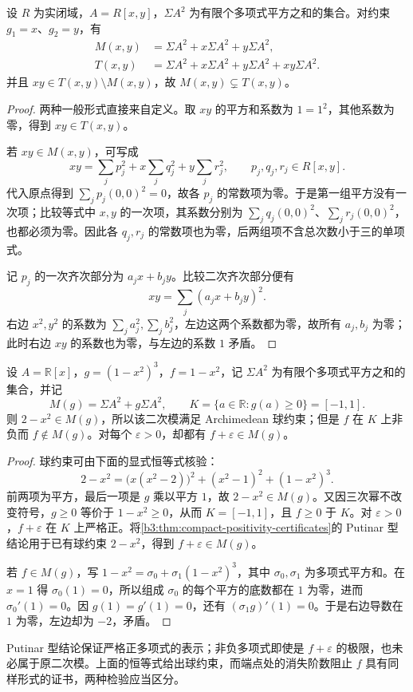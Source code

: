 \begin{proposition}\label{b3:prop:G-module-preordering-difference}
	设 \(R\) 为实闭域，\(A=R[x,y]\)，\(\Sigma A^2\) 为有限个多项式平方之和的集合。对约束 \(g_1=x\)、\(g_2=y\)，有
	\[
		\begin{aligned}
			M(x,y)&=\Sigma A^2+x\Sigma A^2+y\Sigma A^2,\\
			T(x,y)&=\Sigma A^2+x\Sigma A^2+y\Sigma A^2+xy\Sigma A^2.
		\end{aligned}
	\]
	并且 \(xy\in T(x,y)\setminus M(x,y)\)，故 \(M(x,y)\subsetneq T(x,y)\)。
\end{proposition}
\begin{proof}
	两种一般形式直接来自定义。取 \(xy\) 的平方和系数为 \(1=1^2\)，其他系数为零，得到 \(xy\in T(x,y)\)。

	若 \(xy\in M(x,y)\)，可写成
	\[
		xy=\sum_jp_j^2+x\sum_jq_j^2+y\sum_jr_j^2, \qquad p_j,q_j,r_j\in R[x,y].
	\]
	代入原点得到 \(\sum_jp_j(0,0)^2=0\)，故各 \(p_j\) 的常数项为零。于是第一组平方没有一次项；比较等式中 \(x,y\) 的一次项，其系数分别为 \(\sum_jq_j(0,0)^2\)、\(\sum_jr_j(0,0)^2\)，也都必须为零。因此各 \(q_j,r_j\) 的常数项也为零，后两组项不含总次数小于三的单项式。

	记 \(p_j\) 的一次齐次部分为 \(a_jx+b_jy\)。比较二次齐次部分便有
	\[
		xy=\sum_j(a_jx+b_jy)^2.
	\]
	右边 \(x^2,y^2\) 的系数为 \(\sum_ja_j^2,\sum_jb_j^2\)，左边这两个系数都为零，故所有 \(a_j,b_j\) 为零；此时右边 \(xy\) 的系数也为零，与左边的系数 \(1\) 矛盾。
\end{proof}

\begin{proposition}\label{b3:prop:G-strict-positivity-warning}
	设 \(A=\mathbb R[x]\)，\(g=(1-x^2)^3\)，\(f=1-x^2\)，记 \(\Sigma A^2\) 为有限个多项式平方之和的集合，并记
	\[
		M(g)=\Sigma A^2+g\Sigma A^2, \qquad K=\{a\in\mathbb R:g(a)\ge0\}=[-1,1].
	\]
	则 \(2-x^2\in M(g)\)，所以该二次模满足 Archimedean 球约束；但是 \(f\) 在 \(K\) 上非负而 \(f\notin M(g)\)。对每个 \(\varepsilon>0\)，却都有 \(f+\varepsilon\in M(g)\)。
\end{proposition}
\begin{proof}
	球约束可由下面的显式恒等式核验：
	\[
		2-x^2=\bigl(x(x^2-2)\bigr)^2+(x^2-1)^2+(1-x^2)^3.
	\]
	前两项为平方，最后一项是 \(g\) 乘以平方 \(1\)，故 \(2-x^2\in M(g)\)。又因三次幂不改变符号，\(g\ge0\) 等价于 \(1-x^2\ge0\)，从而 \(K=[-1,1]\)，且 \(f\ge0\) 于 \(K\)。对 \(\varepsilon>0\)，\(f+\varepsilon\) 在 \(K\) 上严格正。将\cref{b3:thm:compact-positivity-certificates}的 Putinar 型结论用于已有球约束 \(2-x^2\)，得到 \(f+\varepsilon\in M(g)\)。

	若 \(f\in M(g)\)，写 \(1-x^2=\sigma_0+\sigma_1(1-x^2)^3\)，其中 \(\sigma_0,\sigma_1\) 为多项式平方和。在 \(x=1\) 得 \(\sigma_0(1)=0\)，所以组成 \(\sigma_0\) 的每个平方的底数都在 \(1\) 为零，进而 \(\sigma_0'(1)=0\)。因 \(g(1)=g'(1)=0\)，还有 \((\sigma_1g)'(1)=0\)。于是右边导数在 \(1\) 为零，左边却为 \(-2\)，矛盾。
\end{proof}

Putinar 型结论保证严格正多项式的表示；非负多项式即使是 \(f+\varepsilon\) 的极限，也未必属于原二次模。上面的恒等式给出球约束，而端点处的消失阶数阻止 \(f\) 具有同样形式的证书，两种检验应当区分。
